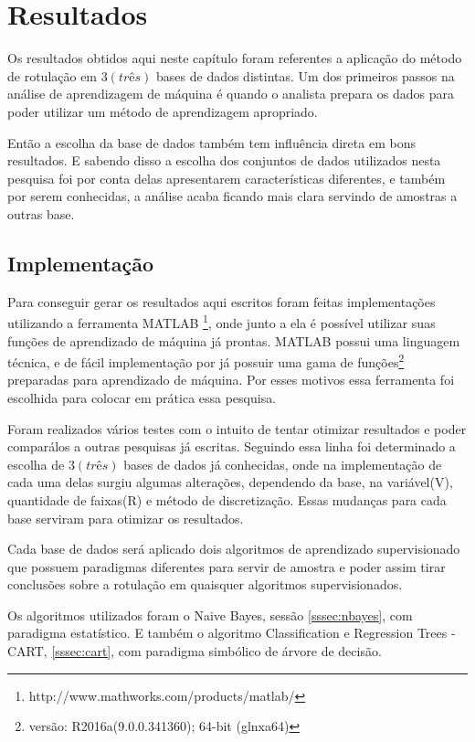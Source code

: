 \chapter{Resultados}\label{cap:resultados}

Os resultados obtidos aqui neste capítulo foram referentes a aplicação do método de rotulação em ${3(três)}$ bases de dados distintas. Um dos primeiros passos na análise de aprendizagem de máquina é quando o analista prepara os dados para poder utilizar  um método de aprendizagem apropriado. 

Então  a escolha da base de dados também tem influência direta em bons resultados. E sabendo disso a escolha dos conjuntos de dados utilizados nesta pesquisa foi por conta delas apresentarem características diferentes, e também por serem conhecidas, a análise acaba ficando mais clara servindo de amostras a outras base.

\section{Implementação}

Para conseguir gerar os resultados aqui escritos foram feitas implementações utilizando a ferramenta MATLAB \footnote{http://www.mathworks.com/products/matlab/}, onde junto  a ela é possível utilizar suas funções de aprendizado de máquina já prontas. MATLAB possui uma linguagem técnica, e de fácil implementação por já possuir uma gama de funções\footnote{versão: R2016a(9.0.0.341360); 64-bit (glnxa64)} preparadas para aprendizado de máquina. Por esses motivos essa ferramenta foi escolhida para colocar em prática essa pesquisa.

Foram realizados vários testes com o intuito de tentar otimizar resultados e poder comparálos a outras pesquisas já escritas. Seguindo essa linha foi determinado a escolha de ${3(três)}$ bases de dados já conhecidas, onde na implementação de cada uma delas surgiu algumas alterações, dependendo da base, na variável(V), quantidade de faixas(R) e método de discretização. Essas mudanças para cada base serviram para otimizar os resultados. 

Cada base de dados será aplicado dois algoritmos de aprendizado supervisionado que possuem paradigmas diferentes para servir de amostra e poder assim tirar conclusões sobre a rotulação em quaisquer algoritmos supervisionados.  

Os algoritmos utilizados foram o Naive Bayes, sessão \ref{sssec:nbayes}, com paradigma estatístico. E também o algoritmo Classification e Regression Trees - CART, \ref{sssec:cart}, com paradigma simbólico de  árvore de decisão.

